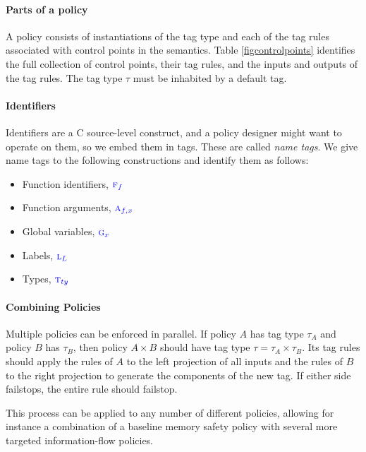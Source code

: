 \documentclass{llncs}
\begin{document}
{\paragraph*{Parts of a policy}

A policy consists of instantiations of the tag type
and each of the tag rules associated with control points in the semantics. Table \cref{figcontrolpoints}
identifies the full collection of control points, their tag rules, and the inputs and outputs of the tag rules.
The tag type \(\tau\) must be inhabited by a default tag.

\paragraph*{Identifiers}

Identifiers are a C source-level construct, and a policy designer might want to operate on them,
so we embed them in tags. These are called {\em name tags}. We give name tags to the
following constructions and identify them as follows:
\begin{itemize}
\item Function identifiers, \({\color{blue} \textnormal{\sc f}_{f}}\)
\item Function arguments, \({\color{blue} \textnormal{\sc a}_{f,x}}\)
\item Global variables, \({\color{blue} \textnormal{\sc g}_{x}}\)
\item Labels, \({\color{blue} \textnormal{\sc l}_{L}}\)
\item Types, \({\color{blue} \textnormal{\sc t}_{ty}}\)
\end{itemize}

\paragraph*{Combining Policies}

Multiple policies can be enforced in parallel. If policy \(A\) has tag type \(\tau_A\)
and policy \(B\) has \(\tau_B\), then policy \(A \times B\) should have tag type
\(\tau = \tau_A \times \tau_B\). Its tag rules should apply the rules of \(A\) to
the left projection of all inputs and the rules of \(B\) to the right projection
to generate the components of the new tag. If either side failstops, the entire
rule should failstop.


This process can be applied to any number of different policies, allowing for instance
a combination of a baseline memory safety policy with several more targeted
information-flow policies.

}
\end{document}
